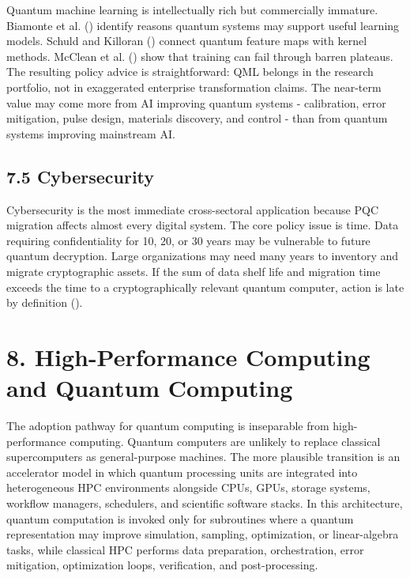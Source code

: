\documentclass[
  11pt,
  letterpaper,
]{article}
\begin{document}
Quantum machine learning is intellectually rich but commercially
immature. Biamonte et al. () identify
reasons quantum systems may support useful learning models. Schuld and
Killoran () connect quantum feature maps
with kernel methods. McClean et al. ()
show that training can fail through barren plateaus. The resulting
policy advice is straightforward: QML belongs in the research portfolio,
not in exaggerated enterprise transformation claims. The near-term value
may come more from AI improving quantum systems - calibration, error
mitigation, pulse design, materials discovery, and control - than from
quantum systems improving mainstream AI.

\subsection{7.5 Cybersecurity}\label{cybersecurity}

Cybersecurity is the most immediate cross-sectoral application because
PQC migration affects almost every digital system. The core policy issue
is time. Data requiring confidentiality for 10, 20, or 30 years may be
vulnerable to future quantum decryption. Large organizations may need
many years to inventory and migrate cryptographic assets. If the sum of
data shelf life and migration time exceeds the time to a
cryptographically relevant quantum computer, action is late by
definition ().

\section{8. High-Performance Computing and Quantum
Computing}\label{high-performance-computing-and-quantum-computing}

The adoption pathway for quantum computing is inseparable from
high-performance computing. Quantum computers are unlikely to replace
classical supercomputers as general-purpose machines. The more plausible
transition is an accelerator model in which quantum processing units are
integrated into heterogeneous HPC environments alongside CPUs, GPUs,
storage systems, workflow managers, schedulers, and scientific software
stacks. In this architecture, quantum computation is invoked only for
subroutines where a quantum representation may improve simulation,
sampling, optimization, or linear-algebra tasks, while classical HPC
performs data preparation, orchestration, error mitigation, optimization
loops, verification, and post-processing.
\end{document}
